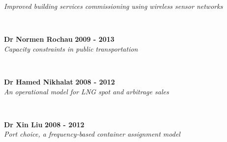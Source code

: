\documentclass[margin]{res}
\newcommand\tab[1][1cm]{\hspace*{#1}}
\begin{document}
\begin{resume}
\begin{minipage}{\textwidth}
	\tab[0.2in] \textit{Improved building services commissioning using wireless sensor networks}
	\end{minipage}
	\\
	\vspace{0.03in}
	\begin{minipage}{\textwidth}
	{\bf Dr Normen Rochau} \hfill {\bf 2009 - 2013} \\
	\tab[0.2in] \textit{Capacity constraints in public transportation}
	\end{minipage}
	\\
	\vspace{0.03in}
	\begin{minipage}{\textwidth}
	{\bf Dr Hamed Nikhalat} \hfill {\bf 2008 - 2012} \\
	\tab[0.2in] \textit{An operational model for LNG spot and arbitrage sales}
	\end{minipage}
	\\
	\vspace{0.03in}
	\begin{minipage}{\textwidth}
	{\bf Dr Xin Liu} \hfill {\bf 2008 - 2012} \\
	\tab[0.2in] \textit{Port choice, a frequency-based container assignment model}
	\end{minipage}
	\\

\vspace{-0.15in}

\end{resume}
\end{document}
